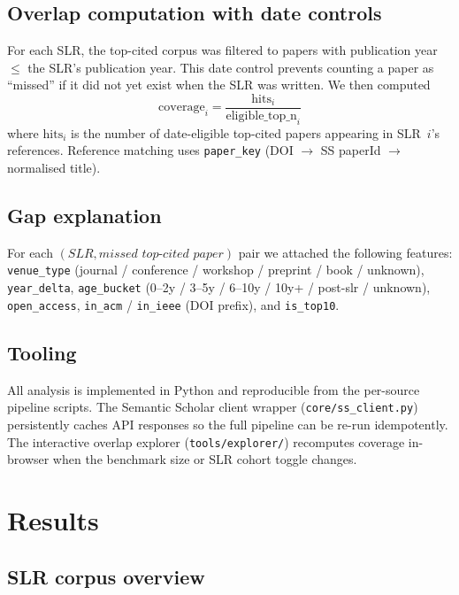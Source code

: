 \documentclass[conference]{IEEEtran}
\begin{document}
\subsection{Overlap computation with date controls}
For each SLR, the top-cited corpus was filtered to papers with publication
year $\leq$ the SLR's publication year. This date control prevents counting
a paper as ``missed'' if it did not yet exist when the SLR was written. We
then computed
\begin{equation}
  \mathrm{coverage}_i = \frac{\mathrm{hits}_i}{\mathrm{eligible\_top\_n}_i}
  \label{eq:coverage}
\end{equation}
where $\mathrm{hits}_i$ is the number of date-eligible top-cited papers
appearing in SLR~$i$'s references. Reference matching uses
\texttt{paper\_key} (DOI $\to$ SS paperId $\to$ normalised title).

\subsection{Gap explanation}
For each $(\textit{SLR}, \textit{missed top-cited paper})$ pair we attached
the following features: \texttt{venue\_type} (journal / conference /
workshop / preprint / book / unknown), \texttt{year\_delta}, \texttt{age\_bucket}
(0--2y / 3--5y / 6--10y / 10y+ / post-slr / unknown), \texttt{open\_access},
\texttt{in\_acm} / \texttt{in\_ieee} (DOI prefix), and \texttt{is\_top10}.

\subsection{Tooling}
All analysis is implemented in Python and reproducible from the per-source
pipeline scripts. The Semantic Scholar client wrapper
(\texttt{core/ss\_client.py}) persistently caches API responses so the full
pipeline can be re-run idempotently. The interactive overlap explorer
(\texttt{tools/explorer/}) recomputes coverage in-browser when the benchmark
size or SLR cohort toggle changes.

\section{Results}

\subsection{SLR corpus overview}
\label{sec:corpus-overview}
\end{document}
